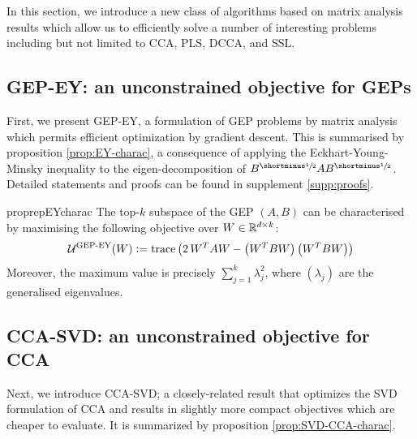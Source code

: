 In this section, we introduce a new class of algorithms based on matrix analysis results which allow us to efficiently solve a number of interesting problems including but not limited to CCA, PLS, DCCA, and SSL.

\subsection{GEP-EY: an unconstrained objective for GEPs}

First, we present GEP-EY, a formulation of GEP problems by matrix analysis which permits efficient optimization by gradient descent.
This is summarised by proposition \ref{prop:EY-charac}, a consequence of applying the Eckhart-Young-Minsky inequality \cite{stewart_matrix_1990} to the eigen-decomposition of $B^\mhalf A B^\mhalf$. Detailed statements and proofs can be found in supplement \ref{supp:proofs}.

\begin{restatable}{proprep}{EYcharac}
    \label{prop:EY-charac}
    The top-$k$ subspace of the GEP $(A,B)$ can be characterised by maximising the following objective over $W \in \mathbb{R}^{d \times k}$:
    \begin{align}
        \mathcal{U}^\text{GEP-EY}(W) \vcentcolon= \operatorname{trace} \left( 2\, W^T A W - \left(W^T B W\right) \left(W^T B W\right) \right)
    \end{align}
    Moreover, the maximum value is precisely $\sum_{j=1}^k \lambda_j^2$, where $(\lambda_j)$ are the generalised eigenvalues.
\end{restatable}

\subsection{CCA-SVD: an unconstrained objective for CCA}\label{sec:gep-ey-formulation}
Next, we introduce CCA-SVD; a closely-related result that optimizes the SVD formulation of CCA and results in slightly more compact objectives which are cheaper to evaluate. It is summarized by proposition \ref{prop:SVD-CCA-charac}.

